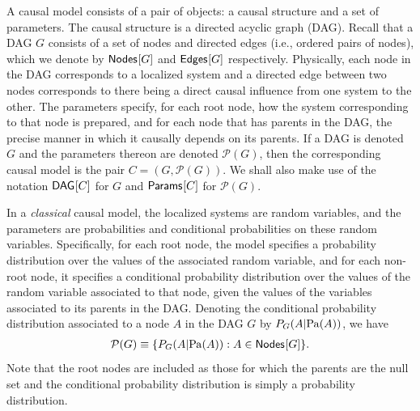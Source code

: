 {\color{blue} A causal model consists of a pair of objects: a causal structure and a set of parameters.  The causal structure is a directed acyclic graph (DAG).  Recall that a DAG $G$ consists of a set of nodes and directed edges (i.e., ordered pairs of nodes), which we denote by ${\operatorname{\mathsf{Nodes}}_{}}\lbrack G\rbrack$ and ${\operatorname{\mathsf{Edges}}_{}}\lbrack G\rbrack$ respectively.  Physically, each node in the DAG corresponds to a localized system and a directed edge between two nodes corresponds to there being a direct causal influence from one system to the other.  The parameters specify, for each root node, how the system corresponding to that node is prepared, and for each node that has parents in the DAG, the precise manner in which it causally depends on its parents.  If a DAG is denoted $G$ and the parameters thereon are denoted $\mathcal{P}(G)$, then the corresponding causal model is the pair $C = (G,\mathcal{P}(G))$.  We shall also make use of the notation ${\operatorname{\mathsf{DAG}}_{}}\lbrack C\rbrack$ for $G$ and ${\operatorname{\mathsf{Params}}_{}}\lbrack C\rbrack$ for $\mathcal{P}(G)$.

In a {\em classical} causal model, the localized systems are random variables, and the parameters are probabilities and conditional probabilities on these random variables.  Specifically, for each root node, the model specifies a probability distribution over the values of the associated random variable, and for each non-root node, it specifies a conditional probability distribution over the values of the random variable associated to that node, given the values of the variables associated to its parents in the DAG.  Denoting the conditional probability distribution associated to a node $A$ in the DAG $G$ by $P_G(A|{\rm Pa}(A))$, we have
\begin{align}
\mathcal{P}(G) \equiv \{ P_G(A|{\rm Pa}(A)): A \in {\operatorname{\mathsf{Nodes}}_{}}\lbrack G\rbrack\}.
\end{align}
Note that the root nodes are included as those for which the parents are the null set and the conditional probability distribution is simply a probability distribution.

}
